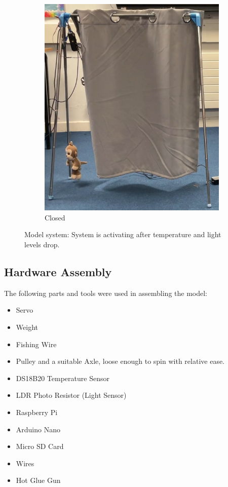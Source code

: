 \documentclass[a4paper,12pt]{article}
\begin{document}
\begin{figure}
\begin{subfigure}[][][]{0.24\textwidth}
        \includegraphics[width=\linewidth]{figures/model_curtainClosing3.png}
        \caption{Closed}
    \end{subfigure}
 
    \caption{Model system: System is activating after temperature and light levels drop.}
    \label{fig:curtainSys}
\end{figure}

\subsection{Hardware Assembly}

The following parts and tools were used in assembling the model:

\begin{itemize}
    \item Servo
    \item Weight
    \item Fishing Wire
    \item Pulley and a suitable Axle, loose enough to spin with relative ease.
    \item DS18B20 Temperature Sensor
    \item LDR Photo Resistor (Light Sensor)
    \item Raspberry Pi
    \item Arduino Nano
    \item Micro SD Card
    \item Wires
    \item Hot Glue Gun
\end{itemize}
\end{document}

